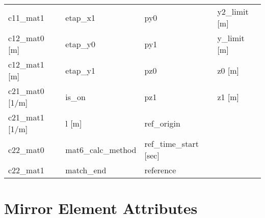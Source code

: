 \begin{tabular}{llll}
c11_mat1                         & etap_x1                          & py0                              & y2_limit [m]                     \\
c12_mat0 [m]                     & etap_y0                          & py1                              & y_limit [m]                      \\
c12_mat1 [m]                     & etap_y1                          & pz0                              & z0 [m]                           \\
c21_mat0 [1/m]                   & is_on                            & pz1                              & z1 [m]                           \\
c21_mat1 [1/m]                   & l [m]                            & ref_origin                       &                                  \\
c22_mat0                         & mat6_calc_method                 & ref_time_start [sec]             &                                  \\
c22_mat1                         & match_end                        & reference                        &                                  \\
 \bottomrule
 \end{tabular}
 \vfill
 
 \section{Mirror Element Attributes}
 \label{s:list.mirror}
 
